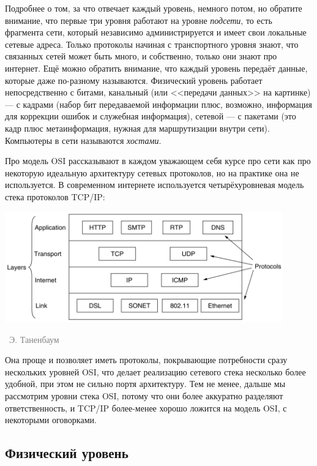 \documentclass[a5paper]{article}
\newcommand{\attribution}[1] {
\vspace{-5mm}\begin{flushright}\begin{scriptsize}\textcolor{gray}{\textcopyright\, #1}\end{scriptsize}\end{flushright}
}
\begin{document}
Подробнее о том, за что отвечает каждый уровень, немного потом, но обратите внимание, что первые три уровня работают на уровне \textit{подсети}, то есть фрагмента сети, который независимо администрируется и имеет свои локальные сетевые адреса. Только протоколы начиная с транспортного уровня знают, что связанных сетей может быть много, и собственно, только они знают про интернет. Ещё можно обратить внимание, что каждый уровень передаёт данные, которые даже по-разному называются. Физический уровень работает непосредственно с битами, канальный (или <<передачи данных>> на картинке) --- с кадрами (набор бит передаваемой информации плюс, возможно, информация для коррекции ошибок и служебная информация), сетевой --- с пакетами (это кадр плюс метаинформация, нужная для маршрутизации внутри сети). Компьютеры в сети называются \textit{хостами}.

Про модель OSI рассказывают в каждом уважающем себя курсе про сети как про некоторую идеальную архитектуру сетевых протоколов, но на практике она не используется. В современном интернете используется четырёхуровневая модель стека протоколов TCP/IP:

\begin{center}
    \includegraphics[width=0.9\textwidth]{tcpIpStack.png}
    \attribution{Э. Таненбаум}
\end{center}

Она проще и позволяет иметь протоколы, покрывающие потребности сразу нескольких уровней OSI, что делает реализацию сетевого стека несколько более удобной, при этом не сильно портя архитектуру. Тем не менее, дальше мы рассмотрим уровни стека OSI, потому что они более аккуратно разделяют ответственность, и TCP/IP более-менее хорошо ложится на модель OSI, с некоторыми оговорками.

\subsection{Физический уровень}
\end{document}
